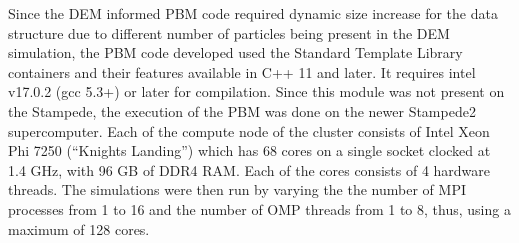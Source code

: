 \documentclass[preprint,11pt,authoryear]{elsarticle}
\begin{document}
Since the DEM informed PBM code required dynamic size increase for the data structure due to different number of particles being
 present in the DEM simulation,
the PBM code developed used the Standard Template Library containers and their features available in C++ 11 and later. It 
requires intel v17.0.2 (gcc 5.3+)  or later for compilation. Since this module was not present on the Stampede, the execution of the 
PBM was done on the newer Stampede2 supercomputer. Each of the compute node of the cluster consists of Intel Xeon Phi 7250 
(\textquotedblleft Knights Landing\textquotedblright) which has 68 cores on a single socket clocked at 1.4 GHz, with 96 GB of DDR4 
RAM.
 Each of the cores consists of 4 hardware threads. The simulations were then run by varying the the number of MPI 
processes from 1 to 16 and the number of OMP threads from 1 to 8, thus, using a maximum of 128 cores.
\end{document}
